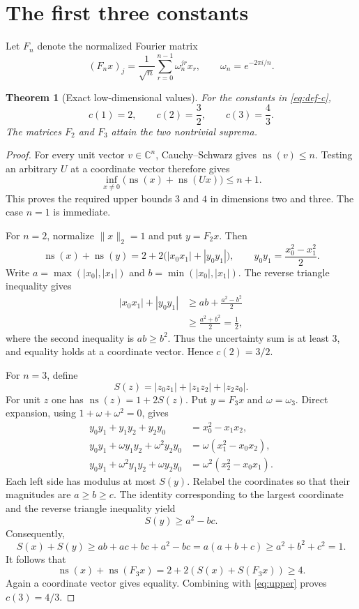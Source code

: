 \documentclass[11pt]{article}
\newtheorem{theorem}{Theorem}
\theoremstyle{remark}
\newcommand{\C}{\mathbb C}
\newcommand{\ns}{\operatorname{ns}}
\newcommand{\1}{\mathbf 1}
\begin{document}
\section{The first three constants}

Let $F_n$ denote the normalized Fourier matrix
\[
 (F_nx)_j=\frac1{\sqrt n}\sum_{r=0}^{n-1}\omega_n^{jr}x_r,
 \qquad \omega_n=e^{-2\pi i/n}.
\]

\begin{theorem}[Exact low-dimensional values]\label{thm:small}
For the constants in \eqref{eq:def-c},
\[
 \boxed{c(1)=2,\qquad c(2)=\frac32,\qquad c(3)=\frac43.}
\]
The matrices $F_2$ and $F_3$ attain the two nontrivial suprema.
\end{theorem}

\begin{proof}
For every unit vector $v\in\C^n$, Cauchy--Schwarz gives $\ns(v)\le n$.
Testing an arbitrary $U$ at a coordinate vector therefore gives
\begin{equation}\label{eq:upper}
 \inf_{x\ne0}\bigl(\ns(x)+\ns(Ux)\bigr)\le n+1.
\end{equation}
This proves the required upper bounds $3$ and $4$ in dimensions two and
three.  The case $n=1$ is immediate.

For $n=2$, normalize $\|x\|_2=1$ and put $y=F_2x$.  Then
\[
 \ns(x)+\ns(y)
 =2+2\bigl(|x_0x_1|+|y_0y_1|\bigr),
 \qquad y_0y_1=\frac{x_0^2-x_1^2}{2}.
\]
Write $a=\max(|x_0|,|x_1|)$ and $b=\min(|x_0|,|x_1|)$.  The reverse triangle
inequality gives
\begin{align*}
 |x_0x_1|+|y_0y_1|
 &\ge ab+\frac{a^2-b^2}{2}\\
 &\ge \frac{a^2+b^2}{2}=\frac12,
\end{align*}
where the second inequality is $ab\ge b^2$.  Thus the uncertainty sum is at
least $3$, and equality holds at a coordinate vector.  Hence $c(2)=3/2$.

For $n=3$, define
\[
 S(z)=|z_0z_1|+|z_1z_2|+|z_2z_0|.
\]
For unit $z$ one has $\ns(z)=1+2S(z)$.  Put $y=F_3x$ and
$\omega=\omega_3$.  Direct expansion, using $1+\omega+\omega^2=0$, gives
\begin{align}
 y_0y_1+y_1y_2+y_2y_0
   &=x_0^2-x_1x_2,\label{eq:q0}\\
 y_0y_1+\omega y_1y_2+\omega^2y_2y_0
   &=\omega(x_1^2-x_0x_2),\label{eq:q1}\\
 y_0y_1+\omega^2y_1y_2+\omega y_2y_0
   &=\omega^2(x_2^2-x_0x_1).\label{eq:q2}
\end{align}
Each left side has modulus at most $S(y)$.  Relabel the coordinates so that
their magnitudes are $a\ge b\ge c$.  The identity corresponding to the
largest coordinate and the reverse triangle inequality yield
\[
 S(y)\ge a^2-bc.
\]
Consequently,
\[
 S(x)+S(y)
 \ge ab+ac+bc+a^2-bc
 =a(a+b+c)
 \ge a^2+b^2+c^2=1.
\]
It follows that
\[
 \ns(x)+\ns(F_3x)=2+2(S(x)+S(F_3x))\ge4.
\]
Again a coordinate vector gives equality.  Combining with
\eqref{eq:upper} proves $c(3)=4/3$.
\end{proof}
\end{document}
